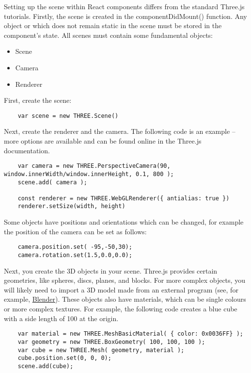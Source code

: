 \documentclass{article}
\begin{document}
			Setting up the scene within React components differs from the standard Three.js tutorials. Firstly, the scene is created in the componentDidMount() function. Any object or which does not remain static in the scene must be stored in the component's state. 
	All scenes must contain some fundamental objects:
	\begin{itemize}
		\item Scene
		\item Camera
		\item Renderer 
	\end{itemize}
	First, create the scene:
	
	\begin{verbatim}
	var scene = new THREE.Scene()
	\end{verbatim}
	
	Next, create the renderer and the camera. The following code is an example -- more options are available and can be found online in the Three.js documentation. 
	
	\begin{verbatim}
	var camera = new THREE.PerspectiveCamera(90, window.innerWidth/window.innerHeight, 0.1, 800 );
	scene.add( camera );
	
	const renderer = new THREE.WebGLRenderer({ antialias: true })
	renderer.setSize(width, height)
	\end{verbatim}	
	
	Some objects have positions and orientations which can be changed, for example the position of the camera can be set as follows:
	
	\begin{verbatim}
	camera.position.set( -95,-50,30);
	camera.rotation.set(1.5,0.0,0.0);
	\end{verbatim}			
	
	Next, you create the 3D objects in your scene. Three.js provides certain geometries, like spheres, discs, planes, and blocks. For more complex objects, you will likely need to import a 3D model made from an external program (see, for example, \href{https://www.blender.org/}{Blender}). These objects also have materials, which can be single colours or more complex textures. For example, the following code creates a blue cube with a side length of 100 at the origin.  
	
	\begin{verbatim}
	var material = new THREE.MeshBasicMaterial( { color: 0x0036FF} );
	var geometry = new THREE.BoxGeometry( 100, 100, 100 );
	var cube = new THREE.Mesh( geometry, material );
	cube.position.set(0, 0, 0);
	scene.add(cube);
	\end{verbatim}
	
\end{document}
